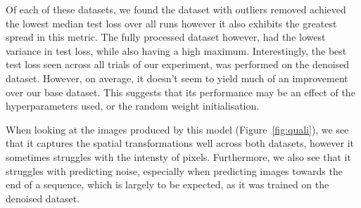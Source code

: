 \documentclass[twocolumn]{article}
\begin{document}
Of each of these datasets, we found the dataset with outliers removed achieved the lowest median test loss over all runs however it also exhibits the greatest spread in this metric. The fully processed dataset however, had the lowest variance in test loss, while also having a high maximum. Interestingly, the best test loss seen across all trials of our experiment, was performed on the denoised dataset. However, on average, it doesn't seem to yield much of an improvement over our base dataset. This suggests that its performance may be an effect of the hyperparameters used, or the random weight initialisation. 

When looking at the images produced by this model (Figure~\ref{fig:quali}), we see that it captures the spatial transformations well across both datasets, however it sometimes struggles with the intensty of pixels. Furthermore, we also see that it struggles with predicting noise, especially when predicting images towards the end of a sequence, which is largely to be expected, as it was trained on the denoised dataset. 
\end{document}
